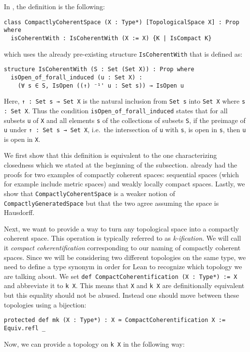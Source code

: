 In \mathlib, the definition is the following: 

\begin{lstlisting}[frame=single]
class CompactlyCoherentSpace (X : Type*) [TopologicalSpace X] : Prop where
  isCoherentWith : IsCoherentWith (X := X) {K | IsCompact K}
\end{lstlisting}

which uses the already pre-existing structure \lstinline|IsCoherentWith| that is defined as: 

\begin{lstlisting}[frame=single]
structure IsCoherentWith (S : Set (Set X)) : Prop where
  isOpen_of_forall_induced (u : Set X) : 
    (∀ s ∈ S, IsOpen ((↑) ⁻¹' u : Set s)) → IsOpen u
\end{lstlisting}

Here, \lstinline|↑ : Set s → Set X| is the natural inclusion from \lstinline|Set s| into \lstinline|Set X| where \lstinline|s : Set X|. 
Thus the condition \lstinline|isOpen_of_forall_induced| states that for all subsets \lstinline|u| of \lstinline|X| and all elements \lstinline|s| of the collections of subsets \lstinline|S|, if the preimage of \lstinline|u| under \lstinline|↑ : Set s → Set X|, i.e.\ the intersection of \lstinline|u| with \lstinline|s|, is open in \lstinline|s|, then \lstinline|u| is open in \lstinline|X|.

We first show that this definition is equivalent to the one characterizing closedness which we stated at the beginning of the subsection. 
\mathlib already had the proofs for two examples of compactly coherent spaces: sequential spaces (which for example include metric spaces) and weakly locally compact spaces. 
Lastly, we show that \lstinline|CompactlyCoherentSpace| is a weaker notion of \lstinline|CompactlyGeneratedSpace| but that the two agree assuming the space is Hausdorff.

Next, we want to provide a way to turn any topological space into a compactly coherent space. 
This operation is typically referred to as \emph{k-ification}. 
We will call it \emph{compact coherentification} corresponding to our naming of compactly coherent spaces. 
Since we will be considering two different topologies on the same type, we need to define a type synonym in order for Lean to recognize which topology we are talking about. 
We set \lstinline|def CompactCoherentification (X : Type*) := X| and abbreviate it to \lstinline|k X|. 
This means that \lstinline|X| and \lstinline|k X| are definitionally equivalent but this equality should not be abused. 
Instead one should move between these topologies using a bijection: 
\begin{lstlisting}[frame=single]
protected def mk (X : Type*) : X ≃ CompactCoherentification X := Equiv.refl _
\end{lstlisting}
Now, we can provide a topology on \lstinline|k X| in the following way: 

